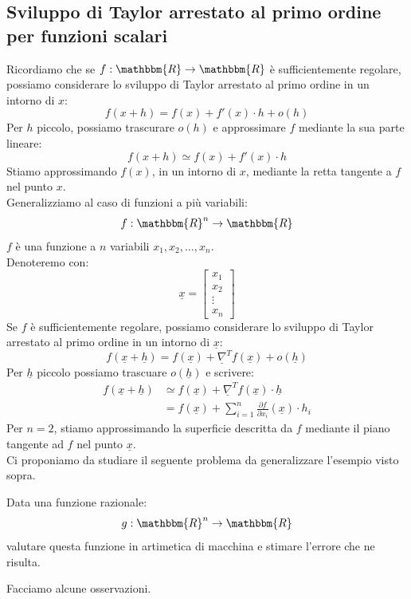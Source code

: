 \documentclass[12pt]{report}
\begin{document}
\subsection{Sviluppo di Taylor arrestato al primo ordine per funzioni scalari}
Ricordiamo che se $f: \mathbbm{R} \to \mathbbm{R}$ è sufficientemente regolare, possiamo considerare lo sviluppo di Taylor arrestato al primo ordine in un intorno di $x$:
\[
f(x + h) = f(x) + f'(x) \cdot h + o(h)
\]
Per $h$ piccolo, possiamo trascurare $o(h)$ e approssimare $f$ mediante la sua parte lineare:
\[
f(x + h) \simeq f(x) + f'(x) \cdot h
\]
Stiamo approssimando $f(x)$, in un intorno di $x$, mediante la retta tangente a $f$ nel punto $x$. \\
Generalizziamo al caso di funzioni a più variabili:
\[
f: \mathbbm{R}^n \to \mathbbm{R}
\]
$f$ è una funzione a $n$ variabili $x_1, x_2, \dots, x_n$. \\
Denoteremo con:
\[
\underline{x} = \begin{bmatrix}x_1 \\ x_2 \\ \vdots \\ x_n\end{bmatrix}
\]
Se $f$ è sufficientemente regolare, possiamo considerare lo sviluppo di Taylor arrestato al primo ordine in un intorno di $\underline{x}$:
\[
f(\underline{x} + \underline{h}) = f(\underline{x}) + \underline{\nabla}^Tf(\underline{x}) + o(\underline{h})
\]
Per $\underline{h}$ piccolo possiamo trascuare $o(\underline{h})$ e scrivere:
\begin{align*}
f(\underline{x} + \underline{h}) &\simeq f(\underline{x}) + \underline{\nabla}^Tf(\underline{x})\cdot \underline{h} \\
&= f(\underline{x}) + \sum_{i=1}^{n}\frac{\partial f}{\partial x_i}(\underline{x}) \cdot h_i
\end{align*}
Per $n = 2$, stiamo approssimando la superficie descritta da $f$ mediante il piano tangente ad $f$ nel punto $\underline{x}$. \\
Ci proponiamo da studiare il seguente problema da generalizzare l'esempio visto sopra.
\begin{assignment}{}{}
Data una funzione razionale:
\[
g: \mathbbm{R}^n \to \mathbbm{R}
\]
valutare questa funzione in artimetica di macchina e stimare l'errore che ne risulta.
\end{assignment}
Facciamo alcune osservazioni.
\end{document}
